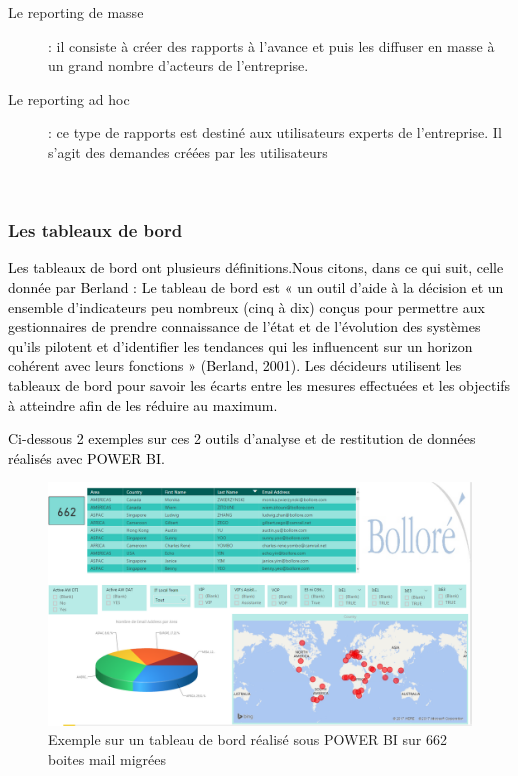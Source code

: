 \documentclass[a4paper,12pt]{report}
\begin{document}
\begin{description}
	\item[Le reporting de masse] : il consiste à créer des rapports à l’avance et puis les diffuser en masse à un grand nombre d’acteurs de l’entreprise.
	\item[Le reporting ad hoc] : ce type de rapports est destiné aux utilisateurs experts de l’entreprise.
    Il s’agit des demandes créées par les utilisateurs
\end{description}

~~\\
\subsubsection*{Les tableaux de bord  }

\textcolor{black}{Les tableaux de bord  ont plusieurs définitions.Nous citons, dans ce qui suit, celle donnée par Berland : Le tableau de bord est « un outil d’aide à la décision et un ensemble d’indicateurs peu nombreux (cinq à dix) conçus pour permettre aux gestionnaires de prendre connaissance de l’état et de l’évolution des systèmes qu’ils pilotent et d’identifier les tendances qui les influencent sur un horizon cohérent avec leurs fonctions » (Berland, 2001). Les décideurs utilisent les tableaux de bord pour savoir les écarts entre les mesures effectuées et les objectifs à atteindre afin de les réduire au maximum.}

\textcolor{black}{Ci-dessous 2 exemples sur ces 2 outils d’analyse et de restitution de données réalisés avec POWER BI.}

\begin{figure}[H]
	\begin{center}
		\includegraphics[width=1\linewidth]{Projet_O365/TB}
\end{center}
	\caption{Exemple sur un tableau de bord réalisé sous POWER BI sur 662 boites mail migrées}
	\label{fig:19}	
\end{figure}
\end{document}
